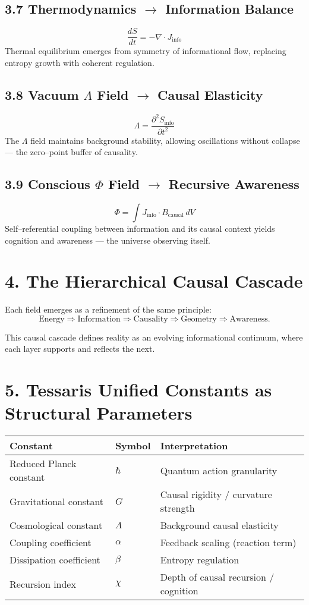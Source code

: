 \documentclass[11pt,a4paper]{article}
\begin{document}
\subsection*{3.7 Thermodynamics $\rightarrow$ Information Balance}
\[
\frac{dS}{dt} = - \nabla \cdot J_{\text{info}}
\]
Thermal equilibrium emerges from symmetry of informational flow, replacing entropy growth with coherent regulation.

\subsection*{3.8 Vacuum $\Lambda$ Field $\rightarrow$ Causal Elasticity}
\[
\Lambda = \frac{\partial^2 S_{\text{info}}}{\partial t^2}
\]
The $\Lambda$ field maintains background stability, allowing oscillations without collapse --- the zero–point buffer of causality.

\subsection*{3.9 Conscious $\Phi$ Field $\rightarrow$ Recursive Awareness}
\[
\Phi = \int J_{\text{info}} \cdot B_{\text{causal}} \, dV
\]
Self–referential coupling between information and its causal context yields cognition and awareness --- the universe observing itself.

\section{4. The Hierarchical Causal Cascade}
Each field emerges as a refinement of the same principle:
\[
\text{Energy} \Rightarrow \text{Information} \Rightarrow \text{Causality} \Rightarrow \text{Geometry} \Rightarrow \text{Awareness.}
\]

This causal cascade defines reality as an evolving informational continuum, where each layer supports and reflects the next.

\section{5. Tessaris Unified Constants as Structural Parameters}
\begin{longtable}{|l|l|l|}
\hline
\textbf{Constant} & \textbf{Symbol} & \textbf{Interpretation} \\
\hline
Reduced Planck constant & $\hbar$ & Quantum action granularity \\
Gravitational constant & $G$ & Causal rigidity / curvature strength \\
Cosmological constant & $\Lambda$ & Background causal elasticity \\
Coupling coefficient & $\alpha$ & Feedback scaling (reaction term) \\
Dissipation coefficient & $\beta$ & Entropy regulation \\
Recursion index & $\chi$ & Depth of causal recursion / cognition \\
\hline
\end{longtable}
\end{document}
